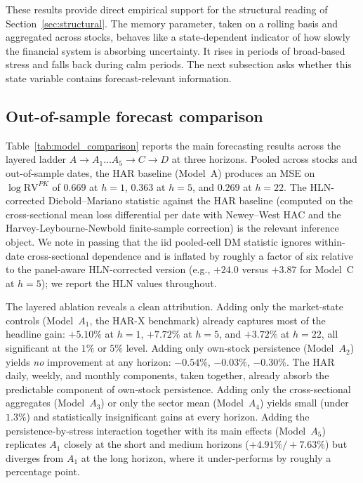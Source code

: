 \documentclass[11pt,a4paper]{article}
\newcommand{\RVPK}{\mathrm{RV}^{PK}}
\begin{document}
These results provide direct empirical support for the structural
reading of Section~\ref{sec:structural}. The memory parameter, taken on
a rolling basis and aggregated across stocks, behaves like a
state-dependent indicator of how slowly the financial system is
absorbing uncertainty. It rises in periods of broad-based stress and
falls back during calm periods. The next subsection asks whether this
state variable contains forecast-relevant information.

\subsection{Out-of-sample forecast comparison}

Table~\ref{tab:model_comparison} reports the main forecasting results
across the layered ladder $A\to A_1\dots A_5\to C\to D$ at three
horizons. Pooled across stocks and out-of-sample dates, the HAR
baseline (Model~A) produces an MSE on $\log\RVPK$ of $0.669$ at $h=1$,
$0.363$ at $h=5$, and $0.269$ at $h=22$. The HLN-corrected
Diebold--Mariano statistic against the HAR baseline (computed on the
cross-sectional mean loss differential per date with Newey--West HAC
and the Harvey-Leybourne-Newbold finite-sample correction) is the
relevant inference object. We note in passing that the iid pooled-cell
DM statistic ignores within-date cross-sectional dependence and is
inflated by roughly a factor of six relative to the panel-aware
HLN-corrected version (e.g., $+24.0$ versus $+3.87$ for Model~C at
$h=5$); we report the HLN values throughout.



The layered ablation reveals a clean attribution. Adding only the
market-state controls (Model~$A_1$, the HAR-X benchmark) already
captures most of the headline gain: $+5.10\%$ at $h=1$, $+7.72\%$ at
$h=5$, and $+3.72\%$ at $h=22$, all significant at the $1\%$ or $5\%$
level. Adding only own-stock persistence (Model~$A_2$) yields
\emph{no} improvement at any horizon: $-0.54\%$, $-0.03\%$, $-0.30\%$.
The HAR daily, weekly, and monthly components, taken together, already
absorb the predictable component of own-stock persistence. Adding only
the cross-sectional aggregates (Model~$A_3$) or only the sector mean
(Model~$A_4$) yields small (under $1.3\%$) and statistically
insignificant gains at every horizon. Adding the persistence-by-stress
interaction together with its main effects (Model~$A_5$) replicates
$A_1$ closely at the short and medium horizons ($+4.91\%/+7.63\%$) but
diverges from $A_1$ at the long horizon, where it under-performs by
roughly a percentage point.
\end{document}
